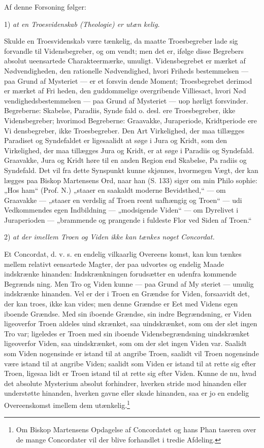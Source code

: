 \documentclass[12pt]{book}
\newcommand{\opage}[1]{\marginnote{\footnotesize\textit{[#1]}}}
\begin{document}
Af denne Forsoning følger:

1) \emph{at en Troesvidenskab (Theologie) er utæn\-%
kelig.} %

Skulde en Troesvidenskab være tænkelig, da maatte
Troesbegreber lade sig forvandle til Vidensbegreber, og om\-%
vendt; men det er, ifølge disse Begrebers absolut ueensartede
Charakteermærke, umuligt. Vidensbegrebet er mærket af
Nødvendigheden, den rationelle Nødvendighed, hvori Friheds\-%
bestemmelsen --- paa Grund af Mysteriet --- er et forsvin\-%
dende Moment; Troesbegrebet derimod er mærket af Fri\-%
heden, den guddommelige overgribende Villiesact, hvori Nød\-%
vendighedsbestemmelsen --- paa Grund af Mysteriet --- uop\-%
hørligt forsvinder. Begreberne: Skabelse, Paradiis, Synde\-%
fald o. desl. ere Troesbegreber, ikke Vidensbegreber; hvorimod
Begreberne: Graavakke, Juraperiode, Kridtperiode ere Vi\-%
densbegreber, ikke Troesbegreber. Den Art Virkelighed, der
maa tillægges Paradiset og Syndefaldet er ligesaalidt at søge i
Jura og Kridt, som den Virkelighed, der maa tillægges Jura
og Kridt, er at søge i Paradiis og Syndefald. Graavakke,
Jura og Kridt høre til en anden Region end Skabelse, Pa\-%
radiis og Syndefald. Det vil fra dette Synspunkt kunne
skjønnes, hvormegen Vægt, der kan lægges paa Biskop
Martensens Ord, naar han (S. 133) siger om min Philo\-%
sophie: „Hos ham“ (Prof. N.) „staaer en saakaldt moderne
Bevidsthed,“ --- om Graavakke --- „staaer en verdslig af
Troen reent uafhængig og Troen“ --- udi Vedkommendes
egen Indbildning --- „modsigende Viden“ --- om Dyrelivet
\opage{35}\setcounter{footnote}{0}%
i Juraperioden --- „brammende og prangende i fuldeste Flor
ved Siden af Troen.“

2) \emph{at der imellem Troen og Viden ikke kan
tænkes noget Concordat.}

Et Concordat, d. v. s. en endelig vilkaarlig Overeens\-%
komst, kan kun tænkes mellem relativt eensartede Magter,
der paa udvortes og endelig Maade indskrænke hinanden:
Indskrænkningen forudsætter en udenfra kommende Begrænds\-%
ning. Men Tro og Viden kunne --- paa Grund af My\-%
steriet --- umulig indskrænke hinanden. Vel er der i Troen
en Grændse for Viden, forsaavidt det, der kan troes, ikke
kan vides; men denne Grændse er Eet med Videns egen
iboende Grændse. Med sin iboende Grændse, sin indre
Begrændsning, er Viden ligeoverfor Troen aldeles uind\-%
skrænket, saa uindskrænket, som om der slet ingen Tro var;
ligeledes er Troen med sin iboende Vidensbegrændsning
uindskrænket ligeoverfor Viden, saa uindskrænket, som om der
slet ingen Viden var. Saalidt som Viden nogensinde er
istand til at angribe Troen, saalidt vil Troen nogensinde
være istand til at angribe Viden; saalidt som Viden er
istand til at rette sig efter Troen, ligesaa lidt er Troen
istand til at rette sig efter Viden. Kunne de nu, hvad det
absolute Mysterium absolut forhindrer, hverken stride mod
hinanden eller understøtte hinanden, hverken gavne eller skade
hinanden, saa er jo en endelig Overeenskomst imellem dem
utænkelig.\footnote{Om Biskop Martensens Opdagelse af Concordatet og hans Phan\-%
taseren over de mange Concordater vil der blive forhandlet i tredie
Afdeling.}
\end{document}
